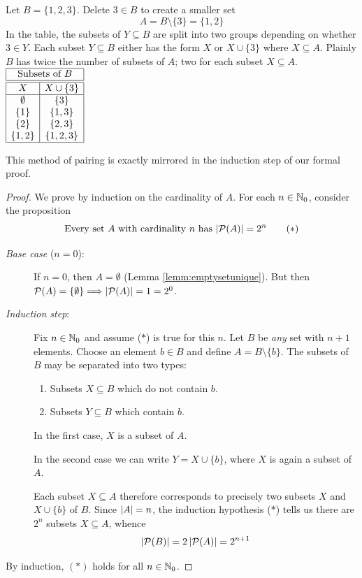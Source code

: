 \begin{example}[lower separated=false, sidebyside, sidebyside align=top seam, sidebyside gap=0pt, righthand width=0.2\linewidth]{}{}
	Let $B=\{1,2,3\}$. Delete $3\in B$ to create a smaller set
	\[
		A=B\setminus\{3\}=\{1,2\}
	\]
	In the table, the subsets of $Y\subseteq B$ are split into two groups depending on whether $3\in Y$. Each subset $Y\subseteq B$ either has the form $X$ or $X\cup\{3\}$ where $X\subseteq A$.\smallbreak
	Plainly $B$ has twice the number of subsets of $A$; two for each subset $X\subseteq A$.
	\tcblower
	\hfill
	$\begin{array}{|c|c|}
		\hline
		\multicolumn{2}{|c|}{\text{Subsets of $B$}}\\\hline\hline
 		X&X\cup\{3\}\\\hline
 		\emptyset&\{3\}\\
 		\{1\}&\{1,3\}\\
 		\{2\}&\{2,3\}\\
 		\{1,2\}&\{1,2,3\}\\\hline
	\end{array}$
\end{example}


This method of pairing is exactly mirrored in the induction step of our formal proof.

\begin{proof}
 	We prove by induction on the cardinality of $A$. For each $n\in\mathbb{N}_0$, consider the proposition
	\[
		\text{Every set $A$ with cardinality $n$ has $\left| \mathcal{P}(A)\right|=2^n$}\tag{$\ast$}
	\]
	\begin{description}
		\item[\normalfont\emph{Base case} ($n=0$):] If $n=0$, then $A=\emptyset$ (Lemma \ref{lemm:emptysetunique}). But then $\mathcal{P}(A)=\{\emptyset\}\Longrightarrow\left| \mathcal{P}(A)\right|=1=2^0$.
		\item[\normalfont\emph{Induction step}:] Fix $n\in\mathbb{N}_0$ and assume ($\ast$) is true for this $n$. Let $B$ be \emph{any} set with $n+1$ elements. Choose an element $b\in B$ and define $A=B\setminus\{b\}$. The subsets of $B$ may be separated into two types:
	\begin{enumerate}
	  \item Subsets $X\subseteq B$ which do not contain $b$.
	  \item Subsets $Y\subseteq B$ which contain $b$.
	\end{enumerate}
	In the first case, $X$ is a subset of $A$.\par
	In the second case we can write $Y=X\cup\{b\}$, where $X$ is again a subset of $A$.\par
	Each subset $X\subseteq A$ therefore corresponds to precisely two subsets $X$ and $X\cup\{b\}$ of $B$. Since $\left| A\right|=n$, the induction hypothesis ($\ast$) tells us there are $2^n$ subsets $X\subseteq A$, whence
	\[
		\left| \mathcal{P}(B)\right|=2\left| \mathcal{P}(A)\right|=2^{n+1}
	\]
	\end{description}
	By induction, $(\ast)$ holds for all $n\in\mathbb{N}_0$.
\end{proof}


